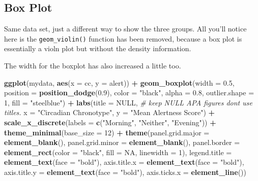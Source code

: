 \documentclass[
]{book}
\newenvironment{Shaded}{\begin{snugshade}}{\end{snugshade}}
\newcommand{\AttributeTok}[1]{\textcolor[rgb]{0.13,0.29,0.53}{#1}}
\newcommand{\CommentTok}[1]{\textcolor[rgb]{0.56,0.35,0.01}{\textit{#1}}}
\newcommand{\ConstantTok}[1]{\textcolor[rgb]{0.56,0.35,0.01}{#1}}
\newcommand{\DecValTok}[1]{\textcolor[rgb]{0.00,0.00,0.81}{#1}}
\newcommand{\FloatTok}[1]{\textcolor[rgb]{0.00,0.00,0.81}{#1}}
\newcommand{\FunctionTok}[1]{\textcolor[rgb]{0.13,0.29,0.53}{\textbf{#1}}}
\newcommand{\NormalTok}[1]{#1}
\newcommand{\SpecialCharTok}[1]{\textcolor[rgb]{0.81,0.36,0.00}{\textbf{#1}}}
\newcommand{\StringTok}[1]{\textcolor[rgb]{0.31,0.60,0.02}{#1}}
\let\oldsubsection\subsection
\renewcommand{\subsection}{\needspace{3\baselineskip}\oldsubsection}  %
\begin{document}
\subsection{Box Plot}\label{box-plot-1}

Same data set, just a different way to show the three groups. All you'll notice here is the \texttt{geom\_violin()} function has been removed, because a box plot is essentially a violn plot but without the density information.

The width for the boxplot has also increased a little too.

\begin{Shaded}
\begin{Highlighting}[]
\FunctionTok{ggplot}\NormalTok{(mydata, }\FunctionTok{aes}\NormalTok{(}\AttributeTok{x =}\NormalTok{ cc, }\AttributeTok{y =}\NormalTok{ alert)) }\SpecialCharTok{+}
  \FunctionTok{geom\_boxplot}\NormalTok{(}\AttributeTok{width =} \FloatTok{0.5}\NormalTok{, }\AttributeTok{position =} \FunctionTok{position\_dodge}\NormalTok{(}\FloatTok{0.9}\NormalTok{), }\AttributeTok{color =} \StringTok{"black"}\NormalTok{, }\AttributeTok{alpha =} \FloatTok{0.8}\NormalTok{, }\AttributeTok{outlier.shape =} \DecValTok{1}\NormalTok{,}
               \AttributeTok{fill =} \StringTok{"steelblue"}\NormalTok{) }\SpecialCharTok{+}
  \FunctionTok{labs}\NormalTok{(}\AttributeTok{title =} \ConstantTok{NULL}\NormalTok{,   }\CommentTok{\# keep NULL APA figures don\textquotesingle{}t use titles.}
       \AttributeTok{x =} \StringTok{"Circadian Chronotype"}\NormalTok{,  }
       \AttributeTok{y =} \StringTok{"Mean Alertness Score"}\NormalTok{) }\SpecialCharTok{+}
  \FunctionTok{scale\_x\_discrete}\NormalTok{(}\AttributeTok{labels =} \FunctionTok{c}\NormalTok{(}\StringTok{"Morning"}\NormalTok{, }\StringTok{"Neither"}\NormalTok{, }\StringTok{"Evening"}\NormalTok{)) }\SpecialCharTok{+}
  \FunctionTok{theme\_minimal}\NormalTok{(}\AttributeTok{base\_size =} \DecValTok{12}\NormalTok{) }\SpecialCharTok{+}
  \FunctionTok{theme}\NormalTok{(}\AttributeTok{panel.grid.major =} \FunctionTok{element\_blank}\NormalTok{(),}
        \AttributeTok{panel.grid.minor =} \FunctionTok{element\_blank}\NormalTok{(),}
        \AttributeTok{panel.border =} \FunctionTok{element\_rect}\NormalTok{(}\AttributeTok{color =} \StringTok{"black"}\NormalTok{, }\AttributeTok{fill =} \ConstantTok{NA}\NormalTok{, }\AttributeTok{linewidth =} \DecValTok{1}\NormalTok{),}
        \AttributeTok{legend.title =} \FunctionTok{element\_text}\NormalTok{(}\AttributeTok{face =} \StringTok{"bold"}\NormalTok{),}
        \AttributeTok{axis.title.x =} \FunctionTok{element\_text}\NormalTok{(}\AttributeTok{face =} \StringTok{"bold"}\NormalTok{),}
        \AttributeTok{axis.title.y =} \FunctionTok{element\_text}\NormalTok{(}\AttributeTok{face =} \StringTok{"bold"}\NormalTok{),}
        \AttributeTok{axis.ticks.x =} \FunctionTok{element\_line}\NormalTok{())}
\end{Highlighting}
\end{Shaded}
\end{document}
